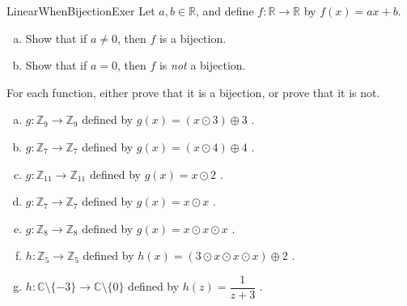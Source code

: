 \begin{exercise}{LinearWhenBijectionExer}
Let $a,b \in \mathbb{R}$, and define $f \colon \mathbb{R} \to \mathbb{R}$ by $f(x) = a x + b$. 
\begin{enumerate}[(a)]
\item \label{LinearWhenBijectionExer-not0}
Show that if $a \neq 0$, then $f$ is a bijection.
\item \label{LinearWhenBijectionExer-0}
Show that if $a = 0$, then $f$ is \emph{not} a bijection.
\end{enumerate}
\end{exercise}


 
 
\begin{exercise}{} 
For each function, either prove that it is a bijection, or prove that it is not.
\begin{enumerate}[(a)]
\item \label{modular9}
 $g \colon {\mathbb Z}_9 \to {\mathbb Z}_9$ defined by $g(x)= (x \odot 3) \oplus 3$ .
\item \label{modular_m6}
 $g \colon {\mathbb Z}_7 \to {\mathbb Z}_7$ defined by $g(x) = (x \odot 4) \oplus 4 $ .
\item \label{modular_m7}
 $g \colon {\mathbb Z}_{11} \to {\mathbb Z}_{11}$ defined by $g(x) =  x \odot 2$ .
\item 
 $g \colon {\mathbb Z}_7 \to {\mathbb Z}_7$ defined by $g(x)= x \odot x$ .
\item 
 $g \colon {\mathbb Z}_8 \to {\mathbb Z}_8$ defined by $g(x)= x \odot x \odot x$ .
\item 
 $h \colon {\mathbb Z}_5 \to {\mathbb Z}_5$ defined by $h(x)= (3 \odot x \odot x \odot x) \oplus 2$ .
\item
 $h \colon {\mathbb C}\setminus \{-3\}  \to {\mathbb C}\setminus \{0\} $ defined by $h(z) =  \dfrac{1}{z+3}$ .
 \end{enumerate}
\end{exercise}


